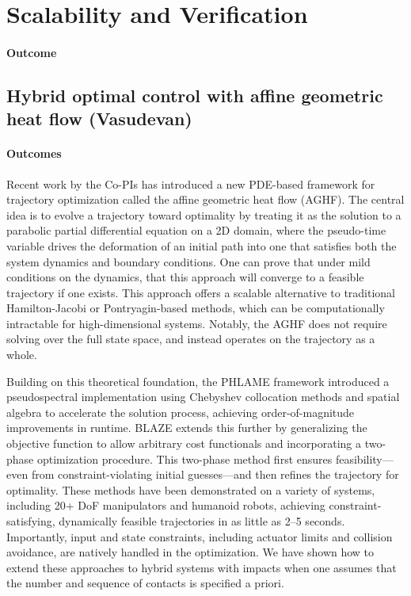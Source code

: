 \documentclass[letterpaper,11pt]{article}
\begin{document}
\section{Scalability and Verification}
\paragraph*{Outcome}

\subsection{Hybrid optimal control with affine geometric heat flow (Vasudevan)}

\paragraph*{Outcomes} Recent work by the Co-PIs has introduced a new PDE-based framework for trajectory optimization called the affine geometric heat flow (AGHF). 
The central idea is to evolve a trajectory toward optimality by treating it as the solution to a parabolic partial differential equation on a 2D domain, where the pseudo-time variable drives the deformation of an initial path into one that satisfies both the system dynamics and boundary conditions. 
One can prove that under mild conditions on the dynamics, that this approach will converge to a feasible trajectory if one exists.
This approach offers a scalable alternative to traditional Hamilton-Jacobi or Pontryagin-based methods, which can be computationally intractable for high-dimensional systems. 
Notably, the AGHF does not require solving over the full state space, and instead operates on the trajectory as a whole.

Building on this theoretical foundation, the PHLAME framework \cite{adu2025phasing} introduced a pseudospectral implementation using Chebyshev collocation methods and spatial algebra to accelerate the solution process, achieving order-of-magnitude improvements in runtime. 
BLAZE \cite{adu2025bring} extends this further by generalizing the objective function to allow arbitrary cost functionals and incorporating a two-phase optimization procedure. This two-phase method first ensures feasibility—even from constraint-violating initial guesses—and then refines the trajectory for optimality. 
These methods have been demonstrated on a variety of systems, including 20+ DoF manipulators and humanoid robots, achieving constraint-satisfying, dynamically feasible trajectories in as little as 2–5 seconds. 
Importantly, input and state constraints, including actuator limits and collision avoidance, are natively handled in the optimization.
We have shown how to extend these approaches to hybrid systems with impacts when one assumes that the number and sequence of contacts is specified a priori. 
\end{document}
